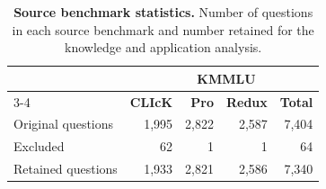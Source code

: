 \begin{table}[t]
\centering
\small
\caption{\textbf{Source benchmark statistics.}
Number of questions in each source benchmark and number retained for the knowledge and application analysis.}
\label{tab:source_stats}
\begin{tabular}{@{}lrrrr@{}}
\toprule
 & & \multicolumn{2}{c}{\textbf{KMMLU}} & \\
\cmidrule(lr){3-4}
 & \textbf{CLIcK} & \textbf{Pro} & \textbf{Redux} & \textbf{Total} \\
\midrule
Original questions & 1,995 & 2,822 & 2,587 & 7,404 \\
Excluded           & 62    & 1     & 1     & 64    \\
\midrule
Retained questions & 1,933 & 2,821 & 2,586 & 7,340 \\
\bottomrule
\end{tabular}
\end{table}